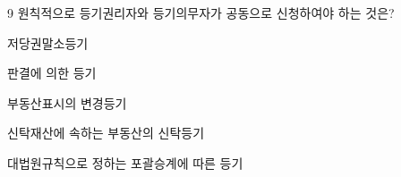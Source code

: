 \begin{question}{9}
원칙적으로 등기권리자와 등기의무자가 공동으로 신청하여야 하는 것은?
\begin{choices}
  \item 저당권말소등기
  \item 판결에 의한 등기
  \item 부동산표시의 변경등기
  \item 신탁재산에 속하는 부동산의 신탁등기
  \item 대법원규칙으로 정하는 포괄승계에 따른 등기
\end{choices}
\end{question}
